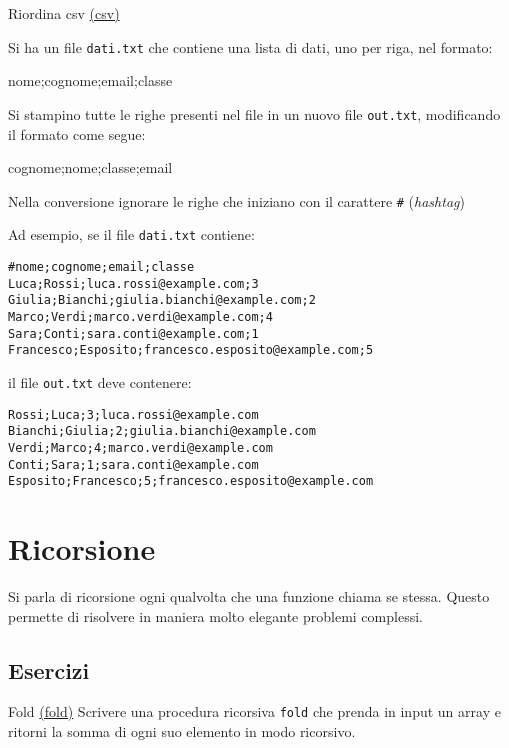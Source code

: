 \begin{esercizio}{Riordina csv \href{run:./files/linux/csv/}{(csv)}}

	Si ha un file \texttt{dati.txt} che contiene una lista di dati, uno per riga, nel formato:
	\begin{center}
		\ttfamily
		nome;cognome;email;classe
	\end{center}
	Si stampino tutte le righe presenti nel file in un nuovo file \verb|out.txt|, modificando il formato come segue:
	\begin{center}
		\ttfamily
		cognome;nome;classe;email
	\end{center}
	Nella conversione ignorare le righe che iniziano con il carattere \verb|#| (\textit{hashtag})
	\begin{minipage}[t]{0.48\linewidth}
	\end{minipage}
	\begin{minipage}[t]{0.48\linewidth}
	\end{minipage}
\end{esercizio}

Ad esempio, se il file \verb|dati.txt| contiene:
\begin{lstlisting}
#nome;cognome;email;classe
Luca;Rossi;luca.rossi@example.com;3
Giulia;Bianchi;giulia.bianchi@example.com;2
Marco;Verdi;marco.verdi@example.com;4
Sara;Conti;sara.conti@example.com;1
Francesco;Esposito;francesco.esposito@example.com;5
\end{lstlisting}

il file \verb|out.txt| deve contenere:
\begin{lstlisting}
Rossi;Luca;3;luca.rossi@example.com
Bianchi;Giulia;2;giulia.bianchi@example.com
Verdi;Marco;4;marco.verdi@example.com
Conti;Sara;1;sara.conti@example.com
Esposito;Francesco;5;francesco.esposito@example.com
\end{lstlisting}

\section{Ricorsione}
Si parla di ricorsione ogni qualvolta che una funzione chiama se stessa. Questo permette di risolvere in maniera molto elegante problemi complessi.
\subsection{Esercizi}


\begin{esercizio}{Fold \href{run:./files/algoritmi/fold/}{(fold)}}
	Scrivere una procedura ricorsiva \verb|fold| che prenda in input un array e ritorni la somma di ogni suo elemento in modo ricorsivo.
\end{esercizio}

